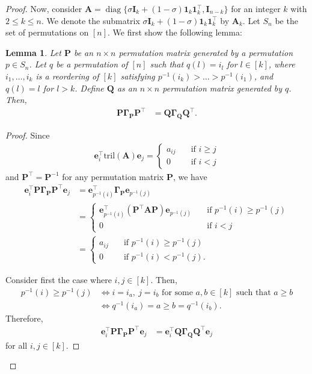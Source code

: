 \documentclass{article}
\theoremstyle{plain}
\newtheorem{lemma}[theorem]{Lemma}
\theoremstyle{definition}
\theoremstyle{remark}
\newcommand{\tril}{\mathrm{tril}}
\newcommand{\mGamma}{\bm{\Gamma}}
\def\vone{{\bm{1}}}
\def\ve{{\bm{e}}}
\def\mA{{\bm{A}}}
\def\mI{{\bm{I}}}
\def\mP{{\bm{P}}}
\def\mQ{{\bm{Q}}}
\DeclareMathOperator{\diag}{diag}
\begin{document}
\begin{proof}
Now, consider $\mA = \diag \{ \sigma \mI_k + (1 - \sigma) \vone_k \vone_k^{\top}, \mI_{n-k} \}$ for an integer $k$ with $2 \le k \le n$. We denote the submatrix $\sigma \mI_k + (1 - \sigma) \vone_k \vone_k^{\top}$ by $\mA_k$. Let $S_n$ be the set of permutations on $[n]$. We first show the following lemma: 
\begin{lemma}
    \label{lem:rpcdperm}
    Let $\mP$ be an $n\times n$ permutation matrix generated by a permutation $p\in S_n$. Let $q$ be a permutation of $[n]$ such that $q(l) = i_l$ for $l \in [k]$, where $i_1, \dots, i_k$ is a reordering of $[k]$ satisfying $p^{-1}(i_k) > \dots > p^{-1}(i_1)$, and $q(l) = l$ for $l > k$. Define $\mQ$ as an $n\times n$ permutation matrix generated by $q$. Then, 
    \begin{align*}
        \mP \mGamma_{\mP} \mP^{\top} &= \mQ \mGamma_{\mQ} \mQ^{\top}.
    \end{align*}
\end{lemma}
\begin{proof}
    Since 
    \begin{align*}
        \ve_i^{\top} \tril(\mA) \ve_j = 
        \begin{cases}
            a_{ij} &\quad \text{if } i\ge j \\
            0 &\quad \text{if } i < j
        \end{cases}
    \end{align*}
    and $\mP^{\top} = \mP^{-1}$ for any permutation matrix $\mP$, we have 
    \begin{align*}
        \ve_i^{\top} \mP \mGamma_{\mP} \mP^{\top} \ve_j &= \ve_{p^{-1}(i)}^{\top} \mGamma_{\mP} \ve_{p^{-1}(j)} \\
        &= \begin{cases}
            \ve_{p^{-1}(i)}^{\top} (\mP^{\top} \mA \mP) \ve_{p^{-1}(j)} &\quad \text{if } p^{-1}(i) \ge p^{-1}(j) \\
            0 &\quad \text{if } i < j
        \end{cases} \\
        &= \begin{cases}
            a_{ij} &\quad \text{if } p^{-1}(i) \ge p^{-1}(j) \\
            0 &\quad \text{if } p^{-1}(i) < p^{-1}(j).
        \end{cases}
    \end{align*}

    Consider first the case where $i, j \in [k]$. Then, 
   \begin{align*}
        p^{-1}(i) \ge p^{-1}(j) &\iff i=i_a,~j=i_b \text{ for some } a,b\in [k] \text{ such that } a \ge b\\
        &\iff q^{-1}(i_a) = a \ge b = q^{-1}(i_b).
    \end{align*}
    Therefore, 
    \begin{align*}
        \ve_i^{\top} \mP \mGamma_{\mP} \mP^{\top} \ve_j &= \ve_i^{\top} \mQ \mGamma_{\mQ} \mQ^{\top} \ve_j
    \end{align*}
    for all $i,j\in [k]$.


\end{proof}
\end{proof}
\end{document}
